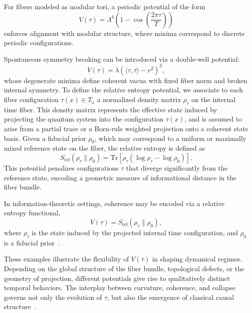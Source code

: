 \documentclass[11pt]{article}
\begin{document}
For fibers modeled as modular tori, a periodic potential of the form
\begin{equation}
V(\tau) = \Lambda^4 \left( 1 - \cos\left( \frac{2\pi \tau}{T} \right) \right)
\end{equation}
enforces alignment with modular structure, where minima correspond to discrete periodic configurations.

Spontaneous symmetry breaking can be introduced via a double-well potential:
\begin{equation}
V(\tau) = \lambda \left( \langle \tau, \tau \rangle - v^2 \right)^2,
\end{equation}
whose degenerate minima define coherent vacua with fixed fiber norm and broken internal symmetry.
To define the relative entropy potential, we associate to each fiber configuration \( \tau(x) \in T_x \) a normalized density matrix \( \rho_\tau \) on the internal time fiber. This density matrix represents the effective state induced by projecting the quantum system into the configuration \( \tau(x) \), and is assumed to arise from a partial trace or a Born-rule weighted projection onto a coherent state basis. Given a fiducial prior \( \rho_0 \), which may correspond to a uniform or maximally mixed reference state on the fiber, the relative entropy is defined as
\begin{equation}
S_{\mathrm{rel}}(\rho_\tau \| \rho_0) = \mathrm{Tr}\left[ \rho_\tau (\log \rho_\tau - \log \rho_0) \right].
\end{equation}
This potential penalizes configurations \( \tau \) that diverge significantly from the reference state, encoding a geometric measure of informational distance in the fiber bundle.

In information-theoretic settings, coherence may be encoded via a relative entropy functional,
\begin{equation}
V(\tau) = S_{\text{rel}}(\rho_\tau \| \rho_0),
\end{equation}
where \( \rho_\tau \) is the state induced by the projected internal time configuration, and \( \rho_0 \) is a fiducial prior~\cite{vedral2002role}.

These examples illustrate the flexibility of \( V(\tau) \) in shaping dynamical regimes. Depending on the global structure of the fiber bundle, topological defects, or the geometry of projection, different potentials give rise to qualitatively distinct temporal behaviors. The interplay between curvature, coherence, and collapse governs not only the evolution of \( \tau \), but also the emergence of classical causal structure~\cite{tomaz2025rqd}.
\end{document}
